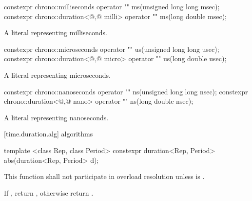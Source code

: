 %
\begin{itemdecl}
constexpr chrono::milliseconds                 operator "" ms(unsigned long long msec);
constexpr chrono::duration<@\unspec,@ milli> operator "" ms(long double msec);
\end{itemdecl}

\begin{itemdescr}
\pnum
\returns
A  literal representing  milliseconds.
\end{itemdescr}

%
\begin{itemdecl}
constexpr chrono::microseconds                 operator "" us(unsigned long long usec);
constexpr chrono::duration<@\unspec,@ micro> operator "" us(long double usec);
\end{itemdecl}

\begin{itemdescr}
\pnum
\returns
A  literal representing  microseconds.
\end{itemdescr}

%
\begin{itemdecl}
constexpr chrono::nanoseconds                 operator "" ns(unsigned long long nsec);
constexpr chrono::duration<@\unspec,@ nano> operator "" ns(long double nsec);
\end{itemdecl}

\begin{itemdescr}
\pnum
\returns
A  literal representing  nanoseconds.
\end{itemdescr}

[time.duration.alg]{ algorithms}

%
\begin{itemdecl}
template <class Rep, class Period>
  constexpr duration<Rep, Period> abs(duration<Rep, Period> d);
\end{itemdecl}

\begin{itemdescr}
\pnum
\remarks This function shall not participate in overload resolution
unless  is .

\pnum
\returns If , return ,
otherwise return .
\end{itemdescr}

